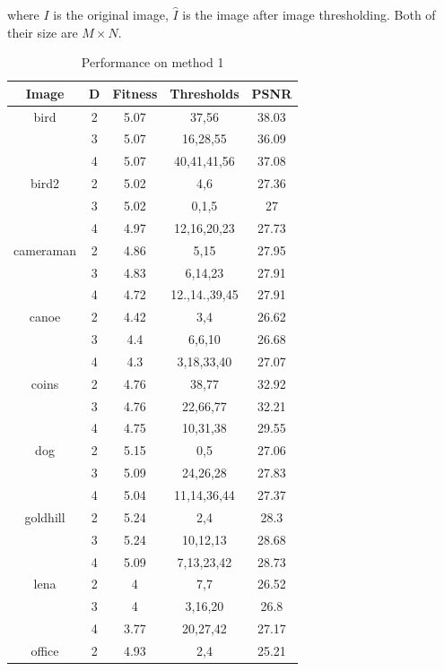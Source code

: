 \documentclass[conference]{IEEEtran}
\begin{document}
where $I$ is the original image, $\hat{I}$ is the image after image thresholding. Both of their size are $M\times N$.

\begin{table}[htbp]
\caption{Performance on method 1}
\begin{center}
\begin{tabular}{|c|c|c|c|c|}
    \hline
    Image & D & Fitness  & Thresholds & PSNR \\
    \hline
    bird & 2 & 5.07 & 37,56 & 38.03\\
    \hline
    & 3 & 5.07 & 16,28,55 & 36.09\\
    \hline
    & 4 & 5.07 & 40,41,41,56 & 37.08\\
    \hline
    bird2 & 2 & 5.02 & 4,6 & 27.36\\
    \hline
    & 3 & 5.02 & 0,1,5 & 27\\
    \hline
    & 4 & 4.97 & 12,16,20,23 & 27.73\\
    \hline
    cameraman & 2 & 4.86 & 5,15 & 27.95\\
    \hline
    & 3 & 4.83 & 6,14,23 & 27.91\\
    \hline
    & 4 & 4.72 & 12.,14.,39,45 & 27.91\\
    \hline
    canoe & 2 & 4.42 & 3,4 & 26.62\\
    \hline
    & 3 & 4.4 & 6,6,10 & 26.68\\
    \hline
    & 4 & 4.3 & 3,18,33,40 & 27.07\\
    \hline
    coins & 2 & 4.76 & 38,77 & 32.92\\
    \hline
    & 3 & 4.76 & 22,66,77 & 32.21\\
    \hline
    & 4 & 4.75 & 10,31,38 & 29.55\\
    \hline
    dog & 2 & 5.15 & 0,5 & 27.06\\
    \hline
    & 3 & 5.09 & 24,26,28 & 27.83\\
    \hline
    & 4 & 5.04 & 11,14,36,44 & 27.37\\
    \hline
    goldhill & 2 & 5.24 & 2,4 & 28.3\\
    \hline
    & 3 & 5.24 & 10,12,13 & 28.68\\
    \hline
    & 4 & 5.09 & 7,13,23,42 & 28.73\\
    \hline
    lena & 2 & 4 & 7,7 & 26.52\\
    \hline
    & 3 & 4 & 3,16,20 & 26.8\\
    \hline
    & 4 & 3.77 & 20,27,42 & 27.17\\
    \hline
    office & 2 & 4.93 & 2,4 & 25.21\\

\end{tabular}
\end{center}
\end{table}
\end{document}
